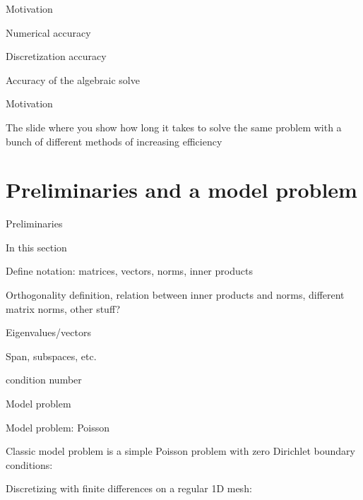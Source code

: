 \documentclass[18pt,xcolor=table]{beamer}
\begin{document}
\begin{frame}{Motivation}
\begin{block}{Numerical accuracy}
\bit
\item Discretization accuracy
\item Accuracy of the algebraic solve
\eit
\end{block}
\end{frame}

\begin{frame}{Motivation}
\begin{block}{The slide where you show how long it takes to solve the same problem with a bunch of different methods of increasing efficiency}
\bit
\item 
\eit
\end{block}
\end{frame}



\section{Preliminaries and a model problem}

\begin{frame}{Preliminaries}
\begin{block}{In this section}
\bit
\item Define notation: matrices, vectors, norms, inner products
\item Orthogonality definition, relation between inner products and norms, different matrix norms, other stuff?
\item Eigenvalues/vectors
\item Span, subspaces, etc.
\item condition number
\eit
\end{block}
\end{frame}

\begin{frame}{Model problem}
\begin{block}{Model problem: Poisson}
\bit
\item Classic model problem is a simple Poisson problem with zero Dirichlet boundary conditions:
\item Discretizing with finite differences on a regular 1D mesh:
\eit
{}
\end{block}
\end{frame}
\end{document}
